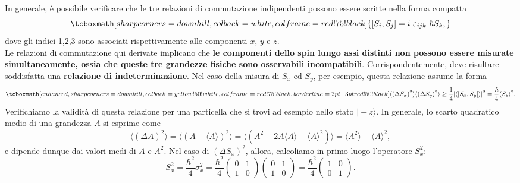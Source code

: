 \documentclass[a4paper,12pt,oneside]{book}
\begin{document}
In generale, è possibile verificare che le tre relazioni di commutazione indipendenti possono essere scritte nella forma compatta
	\begin{equation}
		\tcboxmath[sharp corners=downhill ,colback=white,colframe=red!75!black]{
			\left[ S_i , S_j\right] = i\ \varepsilon_{ijk}\ \hbar S_k,
			}
	\end{equation}
dove gli indici 1,2,3 sono associati rispettivamente alle componenti $x$, $y$ e $z$.\\
Le relazioni di commutazione qui derivate implicano che \textbf{le componenti dello spin lungo assi distinti non possono essere misurate simultaneamente, ossia che queste tre grandezze fisiche sono osservabili incompatibili}. Corrispondentemente, deve risultare soddisfatta una \textbf{relazione di indeterminazione}. Nel caso della misura di $S_x$ ed $S_y$, per esempio, questa relazione assume la forma
	\begin{equation}
		\label{eq:cap4_6}
		\tcboxmath[enhanced,sharp corners=downhill ,colback=yellow!50!white,colframe=red!75!black, borderline={2pt}{-3pt}{red!50!black}]{
			\langle (\Delta S_x) ^2 \rangle \langle (\Delta S_y) ^2 \rangle \geq \frac{1}{4} \vert \langle \left[ S_x , S_y \right] \rangle \vert ^2 = \frac{\hbar}{4} \langle S_z \rangle ^2 .
			}
	\end{equation}
Verifichiamo la validità di questa relazione per una particella che si trovi ad esempio nello stato $\vert +z\rangle$. In generale, lo scarto quadratico medio di una grandezza $A$ si esprime come
	\begin{equation}
		\langle (\Delta A ) ^2 \rangle = \langle (A- \langle A \rangle ) ^2 \rangle = \langle (A^2-2A\langle A \rangle + \langle A \rangle ^2) \rangle = \langle A^2\rangle - \langle A \rangle ^2,
	\end{equation}
e dipende dunque dai valori medi di $A$ e $A^2$. Nel caso di $(\Delta S_x) ^2$, allora, calcoliamo in primo luogo l'operatore $S_x ^2$:
	\begin{equation}
		S_x ^2 = \frac{\hbar ^2}{4} \sigma _x ^2=\frac{\hbar ^2}{4} \begin{pmatrix}
		0 & 1 \\
		1 & 0
		\end{pmatrix} \begin{pmatrix}
		0 & 1 \\
		1 & 0
		\end{pmatrix} = \frac{\hbar ^2}{4}\begin{pmatrix}
		1 & 0 \\
		0 & 1
		\end{pmatrix}.
	\end{equation}
\end{document}
